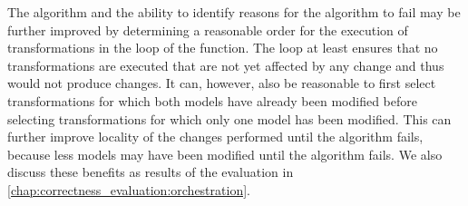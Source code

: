 The algorithm and the ability to identify reasons for the algorithm to fail may be further improved by determining a reasonable order for the execution of transformations in the loop of the  function.
The loop at least ensures that no transformations are executed that are not yet affected by any change and thus would not produce changes.
It can, however, also be reasonable to first select transformations for which both models have already been modified before selecting transformations for which only one model has been modified.
This can further improve locality of the changes performed until the algorithm fails, because less models may have been modified until the algorithm fails.
We also discuss these benefits as results of the evaluation in \autoref{chap:correctness_evaluation:orchestration}.

